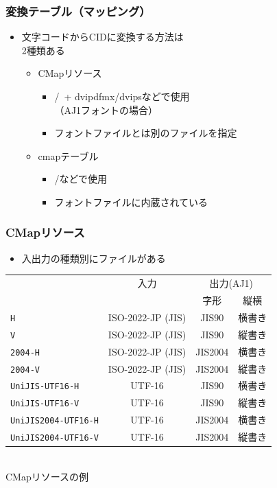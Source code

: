 \begin{frame}\frametitle{変換テーブル（マッピング）}
  \begin{itemize}
  \item 文字コードからCIDに変換する方法は \\
    2種類ある
    \begin{itemize}
    \item CMapリソース
      \begin{itemize}
      \item \pTeX /\upTeX \ + dvipdfmx/dvipsなどで使用 \\
        （AJ1フォントの場合）
      \item フォントファイルとは別のファイルを指定
      \end{itemize}
    \item cmapテーブル
      \begin{itemize}
      \item \LuaTeX /\XeTeX などで使用
      \item フォントファイルに内蔵されている
      \end{itemize}
    \end{itemize}
  \end{itemize}
\end{frame}

\begin{frame}\frametitle{CMapリソース}
  \begin{itemize}
  \item 入出力の種類別にファイルがある
  \end{itemize}

  \begin{center}
    \footnotesize
    \begin{tabular}{l|c|c|c}
      & 入力 & \multicolumn{2}{c}{出力(AJ1)} \\
      \cline{3-4}
      &      & 字形 & 縦横 \\
      \hline
      \texttt{H}                  & ISO-2022-JP (JIS) & JIS90   & 横書き \\
      \texttt{V}                  & ISO-2022-JP (JIS) & JIS90   & 縦書き \\
      \texttt{2004-H}             & ISO-2022-JP (JIS) & JIS2004 & 横書き \\
      \texttt{2004-V}             & ISO-2022-JP (JIS) & JIS2004 & 縦書き \\
      \texttt{UniJIS-UTF16-H}     & UTF-16            & JIS90   & 横書き \\
      \texttt{UniJIS-UTF16-V}     & UTF-16            & JIS90   & 縦書き \\
      \texttt{UniJIS2004-UTF16-H} & UTF-16            & JIS2004 & 横書き \\
      \texttt{UniJIS2004-UTF16-V} & UTF-16            & JIS2004 & 縦書き
    \end{tabular} \\
    CMapリソースの例
  \end{center}
\end{frame}


